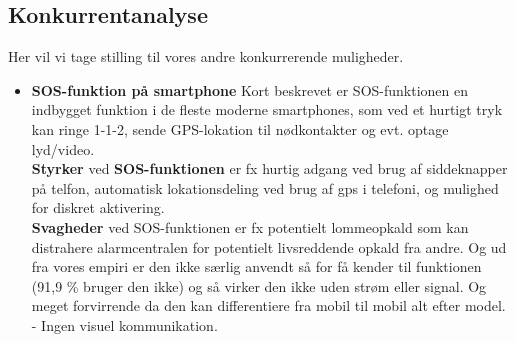 \subsection{Konkurrentanalyse}
Her vil vi tage stilling til vores andre konkurrerende muligheder.
\begin{itemize}
    \item \textbf{SOS-funktion på smartphone}
    Kort beskrevet er SOS-funktionen en indbygget funktion i de fleste moderne smartphones, som ved et hurtigt tryk kan ringe 1-1-2, sende GPS-lokation til nødkontakter og evt. optage lyd/video. \\
    \textbf{Styrker} ved \textbf{SOS-funktionen} er fx hurtig adgang ved brug af siddeknapper på telfon, automatisk lokationsdeling ved brug af gps i telefoni, og mulighed for diskret aktivering.\\
    \textbf{Svagheder} ved SOS-funktionen er fx potentielt lommeopkald som kan distrahere alarmcentralen for potentielt livsreddende opkald fra andre. Og ud fra vores empiri er den ikke særlig anvendt så for få kender til funktionen (91,9 \% bruger den ikke)
    og så virker den ikke uden strøm eller signal.
    Og meget forvirrende da den kan differentiere fra mobil til mobil alt efter model.\\
    - Ingen visuel kommunikation.


\end{itemize}
